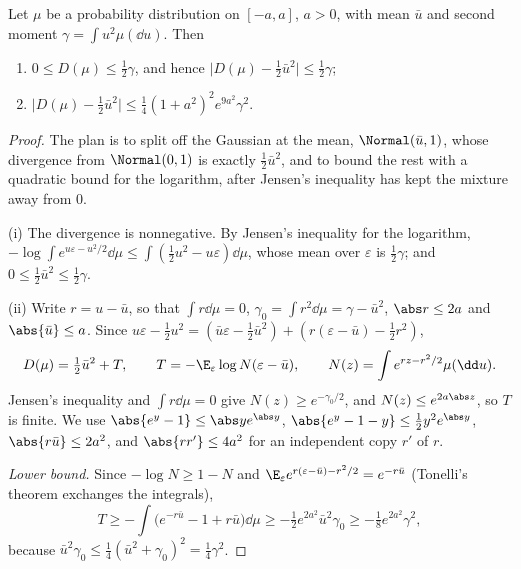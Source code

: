 \begin{refsection}
\begin{lemma}\label{lem:generalization:divergence}
Let $\mu$ be a probability distribution on $[-a,a]$, $a>0$, with mean $\bar u$ and second moment $\gamma=\int u^2\mu(\dd u)$. Then
\begin{enumerate}[label=(\roman*),nosep]
\item $0\le D(\mu)\le\frac12\gamma$, and hence $\bigl\lvert D(\mu)-\frac12\bar u^2\bigr\rvert\le\frac12\gamma$;
\item $\bigl\lvert D(\mu)-\frac12\bar u^2\bigr\rvert\le\frac14(1+a^2)^2e^{9a^2}\gamma^2$.
\end{enumerate}
\end{lemma}

\begin{proof}
The plan is to split off the Gaussian at the mean, $\Normal(\bar u,1)$, whose divergence from $\Normal(0,1)$ is exactly $\frac12\bar u^2$, and to bound the rest with a quadratic bound for the logarithm, after Jensen's inequality has kept the mixture away from $0$.

(i) The divergence is nonnegative. By Jensen's inequality for the logarithm, $-\log\int e^{u\varepsilon-u^2/2}\dd\mu\le\int(\frac12u^2-u\varepsilon)\dd\mu$, whose mean over $\varepsilon$ is $\frac12\gamma$; and $0\le\frac12\bar u^2\le\frac12\gamma$.

(ii) Write $r=u-\bar u$, so that $\int r\dd\mu=0$, $\gamma_0=\int r^2\dd\mu=\gamma-\bar u^2$, $\abs r\le2a$ and $\abs{\bar u}\le a$. Since $u\varepsilon-\frac12u^2=(\bar u\varepsilon-\frac12\bar u^2)+(r(\varepsilon-\bar u)-\frac12r^2)$,
\[
D(\mu)=\tfrac12\bar u^2+T,\qquad T=-\E_\varepsilon\log N(\varepsilon-\bar u),\qquad N(z)=\int e^{rz-r^2/2}\mu(\dd u).
\]
Jensen's inequality and $\int r\dd\mu=0$ give $N(z)\ge e^{-\gamma_0/2}$, and $N(z)\le e^{2a\abs z}$, so $T$ is finite. We use $\abs{e^y-1}\le\abs ye^{\abs y}$, $\abs{e^y-1-y}\le\frac12y^2e^{\abs y}$, $\abs{r\bar u}\le2a^2$, and $\abs{rr'}\le4a^2$ for an independent copy $r'$ of $r$.

\emph{Lower bound.} Since $-\log N\ge1-N$ and $\E_\varepsilon e^{r(\varepsilon-\bar u)-r^2/2}=e^{-r\bar u}$ (Tonelli's theorem exchanges the integrals),
\[
T\ge-\int\bigl(e^{-r\bar u}-1+r\bar u\bigr)\dd\mu\ge-\tfrac12e^{2a^2}\bar u^2\gamma_0\ge-\tfrac18e^{2a^2}\gamma^2,
\]
because $\bar u^2\gamma_0\le\frac14(\bar u^2+\gamma_0)^2=\frac14\gamma^2$.


\end{proof}
\end{refsection}
